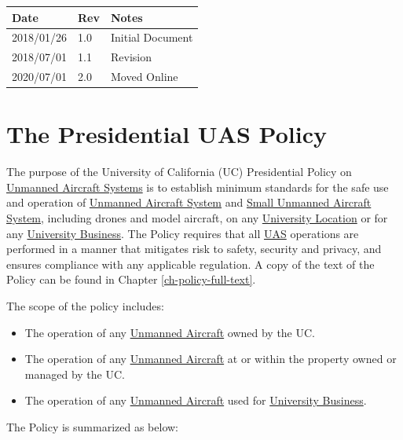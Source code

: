 \documentclass[
]{book}
\providecommand{\tightlist}{%
  \setlength{\itemsep}{0pt}\setlength{\parskip}{0pt}}
\begin{document}
\begin{longtable}[]{@{}lll@{}}
\toprule
Date & Rev & Notes\tabularnewline
\midrule
\endhead
2018/01/26 & 1.0 & Initial Document\tabularnewline
2018/07/01 & 1.1 & Revision\tabularnewline
2020/07/01 & 2.0 & Moved Online\tabularnewline
\bottomrule
\end{longtable}

\hypertarget{ch-policy}{%
\chapter{The Presidential UAS Policy}\label{ch-policy}}

The purpose of the University of California (UC) Presidential Policy on \protect\hyperlink{UAS}{Unmanned Aircraft Systems} is to establish minimum standards for the safe use and operation of \protect\hyperlink{UAS}{Unmanned Aircraft System} and \protect\hyperlink{sUAS}{Small Unmanned Aircraft System}, including drones and model aircraft, on any \protect\hyperlink{UL}{University Location} or for any \protect\hyperlink{UB}{University Business}. The Policy requires that all \protect\hyperlink{UAS}{UAS} operations are performed in a manner that mitigates risk to safety, security and privacy, and ensures compliance with any applicable regulation. A copy of the text of the Policy can be found in Chapter \ref{ch-policy-full-text}.

The scope of the policy includes:

\begin{itemize}
\tightlist
\item
  The operation of any \protect\hyperlink{UA}{Unmanned Aircraft} owned by the UC.
\item
  The operation of any \protect\hyperlink{UA}{Unmanned Aircraft} at or within the property owned or managed by the UC.
\item
  The operation of any \protect\hyperlink{UA}{Unmanned Aircraft} used for \protect\hyperlink{UB}{University Business}.
\end{itemize}

The Policy is summarized as below:
\end{document}
